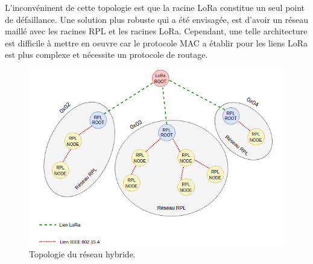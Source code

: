 L'inconvéninent de cette topologie est que la racine LoRa constitue un seul point de défaillance. Une solution plus robuste qui a été envisagée, est d'avoir un réseau maillé avec les racines RPL et les racines LoRa. Cependant, une telle architecture est difficile à mettre en oeuvre car le protocole MAC a établir pour les liens LoRa est plus complexe et nécessite un protocole de routage.

\begin{figure}[H]
    \centering
    \includegraphics[scale=0.7]{res/pictures/loramac-topologie.drawio.png}
    \caption{Topologie du réseau hybride.}
    \label{fig:archi-topologie}
\end{figure}